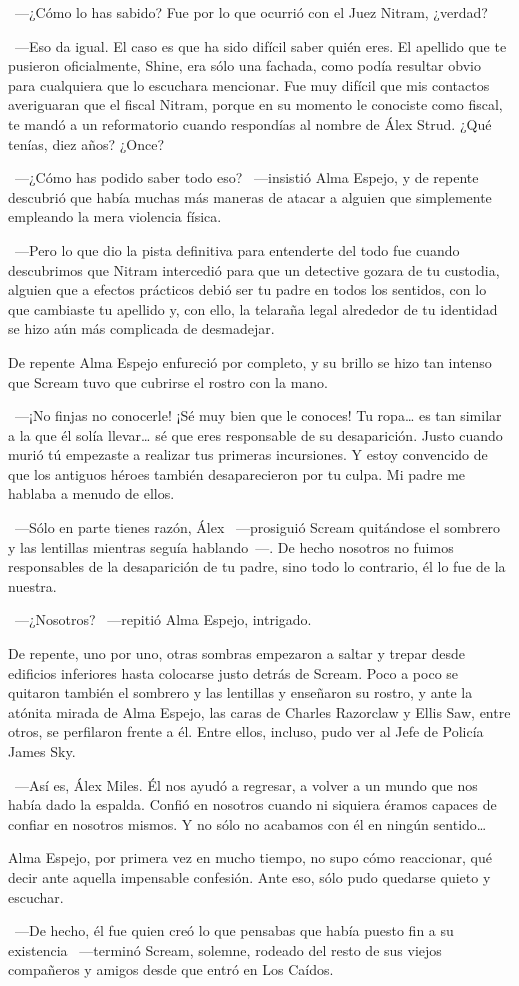 ~---¿Cómo lo has sabido? Fue por lo que ocurrió con el Juez Nitram, ¿verdad?

~---Eso da igual. El caso es que ha sido difícil saber quién eres. El apellido que te pusieron oficialmente, Shine, era sólo una fachada, como podía resultar obvio para cualquiera que lo escuchara mencionar. Fue muy difícil que mis contactos averiguaran que el fiscal Nitram, porque en su momento le conociste como fiscal, te mandó a un reformatorio cuando respondías al nombre de Álex Strud. ¿Qué tenías, diez años? ¿Once?

~---¿Cómo has podido saber todo eso? ~---insistió Alma Espejo, y de repente descubrió que había muchas más maneras de atacar a alguien que simplemente empleando la mera violencia física.

~---Pero lo que dio la pista definitiva para entenderte del todo fue cuando descubrimos que Nitram intercedió para que un detective gozara de tu custodia, alguien que a efectos prácticos debió ser tu padre en todos los sentidos, con lo que cambiaste tu apellido y, con ello, la telaraña legal alrededor de tu identidad se hizo aún más complicada de desmadejar.

De repente Alma Espejo enfureció por completo, y su brillo se hizo tan intenso que Scream tuvo que cubrirse el rostro con la mano.

~---¡No finjas no conocerle! ¡Sé muy bien que le conoces! Tu ropa… es tan similar a la que él solía llevar… sé que eres responsable de su desaparición. Justo cuando murió tú empezaste a realizar tus primeras incursiones. Y estoy convencido de que los antiguos héroes también desaparecieron por tu culpa. Mi padre me hablaba a menudo de ellos.

~---Sólo en parte tienes razón, Álex ~---prosiguió Scream quitándose el sombrero y las lentillas mientras seguía hablando~---. De hecho nosotros no fuimos responsables de la desaparición de tu padre, sino todo lo contrario, él lo fue de la nuestra.

~---¿Nosotros? ~---repitió Alma Espejo, intrigado.

De repente, uno por uno, otras sombras empezaron a saltar y trepar desde edificios inferiores hasta colocarse justo detrás de Scream. Poco a poco se quitaron también el sombrero y las lentillas y enseñaron su rostro, y ante la atónita mirada de Alma Espejo, las caras de Charles Razorclaw y Ellis Saw, entre otros, se perfilaron frente a él. Entre ellos, incluso, pudo ver al Jefe de Policía James Sky.

~---Así es, Álex Miles. Él nos ayudó a regresar, a volver a un mundo que nos había dado la espalda. Confió en nosotros cuando ni siquiera éramos capaces de confiar en nosotros mismos. Y no sólo no acabamos con él en ningún sentido…

Alma Espejo, por primera vez en mucho tiempo, no supo cómo reaccionar, qué decir ante aquella impensable confesión. Ante eso, sólo pudo quedarse quieto y escuchar.

~---De hecho, él fue quien creó lo que pensabas que había puesto fin a su existencia ~---terminó Scream, solemne, rodeado del resto de sus viejos compañeros y amigos desde que entró en Los Caídos.

\endinput
